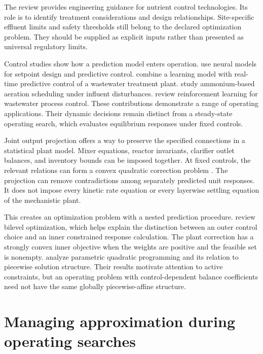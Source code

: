 The \citet{USEPA2009} review provides engineering guidance for nutrient control technologies. Its role is to identify treatment considerations and design relationships. Site-specific effluent limits and safety thresholds still belong to the declared optimization problem. They should be supplied as explicit inputs rather than presented as universal regulatory limits.

Control studies show how a prediction model enters operation. \citet{Sadeghassadi2018} use neural models for setpoint design and predictive control. \citet{Bernardelli2020} combine a learning model with real-time predictive control of a wastewater treatment plant. \citet{Ren2026} study ammonium-based aeration scheduling under influent disturbances. \citet{Croll2023} review reinforcement learning for wastewater process control. These contributions demonstrate a range of operating applications. Their dynamic decisions remain distinct from a steady-state operating search, which evaluates equilibrium responses under fixed controls.

Joint output projection offers a way to preserve the specified connections in a statistical plant model. Mixer equations, reactor invariants, clarifier outlet balances, and inventory bounds can be imposed together. At fixed controls, the relevant relations can form a convex quadratic correction problem \citep{Boyd2004,Stellato2020}. The projection can remove contradictions among separately predicted unit responses. It does not impose every kinetic rate equation or every layerwise settling equation of the mechanistic plant.

This creates an optimization problem with a nested prediction procedure. \citet{Colson2007} review bilevel optimization, which helps explain the distinction between an outer control choice and an inner constrained response calculation. The plant correction has a strongly convex inner objective when the weights are positive and the feasible set is nonempty. \citet{Tondel2003} analyze parametric quadratic programming and its relation to piecewise solution structure. Their results motivate attention to active constraints, but an operating problem with control-dependent balance coefficients need not have the same globally piecewise-affine structure.

\section{Managing approximation during operating searches}


